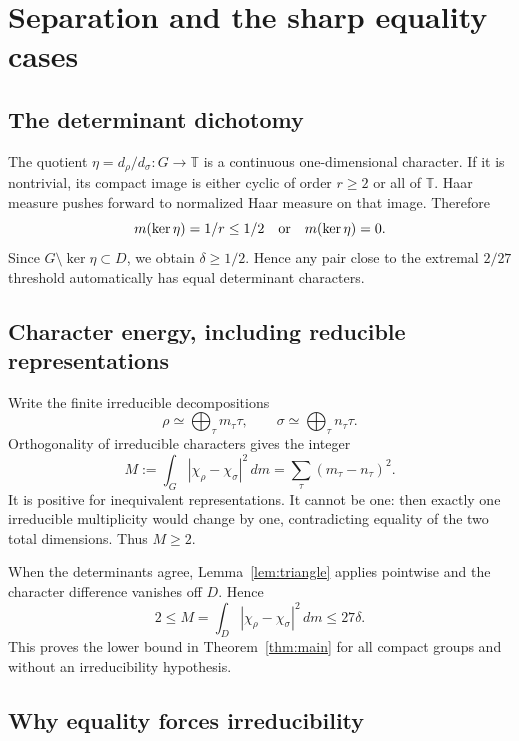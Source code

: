\documentclass[11pt]{article}
\theoremstyle{definition}\newtheorem{definition}[theorem]{Definition}
\theoremstyle{remark}\newtheorem{remark}[theorem]{Remark}
\newcommand{\T}{\mathbb T}\newcommand{\E}{\mathbb E}\newcommand{\GL}{\mathrm{GL}}\newcommand{\SU}{\mathrm{SU}}\newcommand{\U}{\mathrm U}
\begin{document}
\section{Separation and the sharp equality cases}

\subsection{The determinant dichotomy}

The quotient $\eta=d_\rho/d_\sigma:G\to\T$ is a continuous one-dimensional character. If it is nontrivial, its compact image is either cyclic of order $r\ge2$ or all of $\T$. Haar measure pushes forward to normalized Haar measure on that image. Therefore
\[
 m(\ker\eta)=1/r\le1/2\quad\hbox{or}\quad m(\ker\eta)=0.
\]
Since $G\setminus\ker\eta\subset D$, we obtain $\delta\ge1/2$. Hence any pair close to the extremal $2/27$ threshold automatically has equal determinant characters.

\subsection{Character energy, including reducible representations}

Write the finite irreducible decompositions
\[
 \rho\simeq\bigoplus_\tau m_\tau\tau,\qquad
 \sigma\simeq\bigoplus_\tau n_\tau\tau.
\]
Orthogonality of irreducible characters gives the integer
\begin{equation}\label{eq:energy}
 M:=\int_G|\chi_\rho-\chi_\sigma|^2\,dm
   =\sum_\tau(m_\tau-n_\tau)^2.
\end{equation}
It is positive for inequivalent representations. It cannot be one: then exactly one irreducible multiplicity would change by one, contradicting equality of the two total dimensions. Thus $M\ge2$.

When the determinants agree, Lemma~\ref{lem:triangle} applies pointwise and the character difference vanishes off $D$. Hence
\begin{equation}\label{eq:chain}
 2\le M=\int_D|\chi_\rho-\chi_\sigma|^2\,dm\le27\delta.
\end{equation}
This proves the lower bound in Theorem~\ref{thm:main} for all compact groups and without an irreducibility hypothesis.

\subsection{Why equality forces irreducibility}
\end{document}
